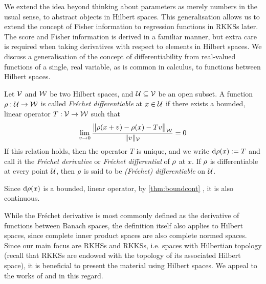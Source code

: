 We extend the idea beyond thinking about parameters as merely numbers in the usual sense, to abstract objects in Hilbert spaces. 
This generalisation allows us to extend the concept of Fisher information to regression functions in RKKSs later.
The score and Fisher information is derived in a familiar manner, but extra care is required when taking derivatives with respect to elements in Hilbert spaces.  
We discuss a generalisation of the concept of differentiability from real-valued functions of a single, real variable, as is common in calculus, to functions between Hilbert spaces.

\begin{definition}\label{def:frechet}
  Let ${\mathcal V}$ and ${\mathcal W}$ be two Hilbert spaces, and ${\mathcal U} \subseteq {\mathcal V}$ be an open subset.
  A function $\rho :{\mathcal U}\to{\mathcal W}$ is called \emph{Fréchet differentiable} at $x \in {\mathcal U}$ if there exists a bounded, linear operator $T:{\mathcal V}\to{\mathcal W}$ such that 
  \[
    \lim_{v\to 0} \frac{\big\Vert \rho(x+v) - \rho(x) - T v \big\Vert_{{\mathcal W}}}{\lVert v\rVert_{\mathcal V}} = 0
  \]
  If this relation holds, then the operator $T$ is unique, and we write $\text{d} \rho(x) := T$ and call it the \emph{Fréchet derivative} or \emph{Fréchet differential} of $\rho$ at $x$.
  If $\rho$ is differentiable at every point ${\mathcal U}$, then $\rho$ is said to be \emph{(Fréchet) differentiable} on ${\mathcal U}$.
\end{definition}

\begin{remark}
  Since $\text{d} \rho(x)$ is a bounded, linear operator, by \cref{thm:boundcont} , it is also continuous. 
\end{remark}

\begin{remark}
  While the Fréchet derivative is most commonly defined as the derivative of functions between Banach spaces,  the definition itself also applies to Hilbert spaces, since complete inner product spaces are also complete normed spaces.
  Since our main focus are RKHSs and RKKSs, i.e. spaces with Hilbertian topology (recall that RKKSs are endowed with the topology of its associated Hilbert space), it is beneficial to present the material using Hilbert spaces.
  We appeal to the works of \citet[Def. 3.6.5]{balakrishnan1981applied} and \citet[Sec. 6]{bouboulis2011extension} in this regard.
\end{remark}

